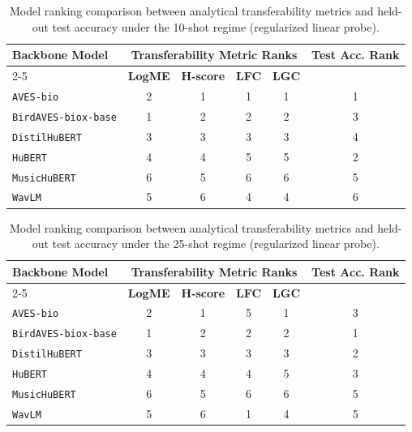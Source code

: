 \begin{table}[htbp]
\centering
\caption{Model ranking comparison between analytical transferability metrics and held-out test accuracy under the 10-shot regime (regularized linear probe).}
\label{tab:rank_comparison_10_shot}
\begin{tabular}{lccccc}
\hline
\textbf{Backbone Model} & \multicolumn{4}{c}{\textbf{Transferability Metric Ranks}} & \textbf{Test Acc. Rank} \\
\cline{2-5}
& \textbf{LogME} & \textbf{H-score} & \textbf{LFC} & \textbf{LGC} & \\
\hline
\texttt{AVES-bio} & 2 & 1 & 1 & 1 & 1 \\
\texttt{BirdAVES-biox-base} & 1 & 2 & 2 & 2 & 3 \\
\texttt{DistilHuBERT} & 3 & 3 & 3 & 3 & 4 \\
\texttt{HuBERT} & 4 & 4 & 5 & 5 & 2 \\
\texttt{MusicHuBERT} & 6 & 5 & 6 & 6 & 5 \\
\texttt{WavLM} & 5 & 6 & 4 & 4 & 6 \\
\hline
\end{tabular}
\end{table}


\begin{table}[htbp]
\centering
\caption{Model ranking comparison between analytical transferability metrics and held-out test accuracy under the 25-shot regime (regularized linear probe).}
\label{tab:rank_comparison_25_shot}
\begin{tabular}{lccccc}
\hline
\textbf{Backbone Model} & \multicolumn{4}{c}{\textbf{Transferability Metric Ranks}} & \textbf{Test Acc. Rank} \\
\cline{2-5}
& \textbf{LogME} & \textbf{H-score} & \textbf{LFC} & \textbf{LGC} & \\
\hline
\texttt{AVES-bio} & 2 & 1 & 5 & 1 & 3 \\
\texttt{BirdAVES-biox-base} & 1 & 2 & 2 & 2 & 1 \\
\texttt{DistilHuBERT} & 3 & 3 & 3 & 3 & 2 \\
\texttt{HuBERT} & 4 & 4 & 4 & 5 & 3 \\
\texttt{MusicHuBERT} & 6 & 5 & 6 & 6 & 5 \\
\texttt{WavLM} & 5 & 6 & 1 & 4 & 5 \\
\hline
\end{tabular}
\end{table}

